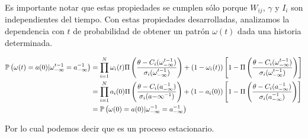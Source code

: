 Es importante notar que estas propiedades se cumplen sólo porque $W_{ij}$, $\gamma$ y $I_i$ son independientes del tiempo. Con estas propiedades desarrolladas, analizamos la dependencia con $t$ de probabilidad de obtener un patrón $\omega(t)$ dada una historia determinada.

\begin{align}
    \nonumber    \mathbb{P}\left(\omega(t)=a(0) | \omega_{-\infty}^{t-1}=a_{-\infty}^{-1}\right) &= \prod_{i=1}^N \omega_i(t) \Pi\left( \frac{\theta - C_i(\omega_{-\infty}^{t-1})}{\sigma_i(\omega_{-\infty}^{t-1})}\right)+(1-\omega_i(t)) \left[ 1-\Pi\left(\frac{\theta - C_i(\omega_{-\infty}^{t-1})}{\sigma_i(\omega_{-\infty}^{t-1})}\right)\right] \\
    \nonumber    & = \prod_{i=1}^N a_i(0) \Pi\left( \frac{\theta - C_i(a_{-\infty}^{-1})}{\sigma_i(a{-\infty}^{-1})}\right)+(1-a_i(0)) \left[ 1-\Pi\left(\frac{\theta - C_i(a_{-\infty}^{-1})}{\sigma_i(a_{-\infty}^{-1})}\right)\right] \\
    &=\mathbb{P}\left(\omega(0)=a(0) | \omega_{-\infty}^{-1}=a_{-\infty}^{-1}\right)
\end{align}

Por lo cual podemos decir que es un proceso estacionario.

